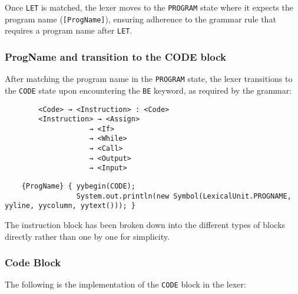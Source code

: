 \documentclass{article}
\begin{document}
	Once \texttt{LET} is matched, the lexer moves to the \texttt{PROGRAM} state where it expects the program name (\texttt{[ProgName]}), ensuring adherence to the grammar rule that requires a program name after \texttt{LET}.

	\subsubsection{ProgName and transition to the CODE block}
	After matching the program name in the \texttt{PROGRAM} state, the lexer transitions to the \texttt{CODE} state upon encountering the \texttt{BE} keyword, as required by the grammar:

	\begin{verbatim}
		<Code> → <Instruction> : <Code>
		<Instruction> → <Assign>
					→ <If>
					→ <While>
					→ <Call>
					→ <Output>
					→ <Input>
	\end{verbatim}

	\begin{verbatim}
	{ProgName} { yybegin(CODE);
				 System.out.println(new Symbol(LexicalUnit.PROGNAME, yyline, yycolumn, yytext())); }
	\end{verbatim}

	The instruction block has been broken down into the different types of blocks directly rather than one by one for simplicity.\\

	\subsubsection{Code Block}

	The following is the implementation of the \texttt{CODE} block in the lexer:
\end{document}
